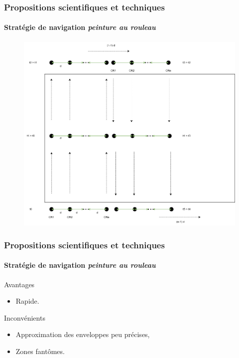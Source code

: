 \documentclass{beamer}
\begin{document}
			\begin{frame}
				\frametitle{Propositions scientifiques et techniques}
				\framesubtitle{Stratégie de navigation \textit{peinture au rouleau}}
				\begin{figure}
					\centering
					\includegraphics[width=0.7\linewidth]{graphics/peinture_au_rouleau.png}
				\end{figure}
			\end{frame}
			\begin{frame}
				\frametitle{Propositions scientifiques et techniques}
				\framesubtitle{Stratégie de navigation \textit{peinture au rouleau}}
				\begin{exampleblock}{Avantages}
					\begin{itemize}
						\item Rapide.
					\end{itemize}
				\end{exampleblock}
				\begin{alertblock}{Inconvénients}
					\begin{itemize}
						\item Approximation des enveloppes peu précises,
						\item Zones fantômes.
					\end{itemize}
				\end{alertblock}
			\end{frame}
\end{document}
